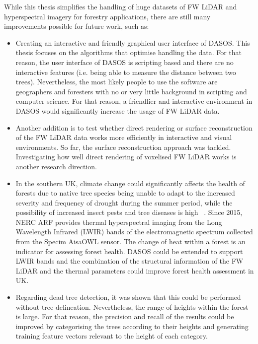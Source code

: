 \documentclass{subfiles}
\begin{document}
\par While this thesis simplifies the handling of huge datasets of FW LiDAR and hyperspectral imagery for forestry applications, there are still many improvements possible for future work, such as:
\begin{itemize}
	\item Creating an interactive and friendly graphical user interface of DASOS. This thesis focuses on the algorithms that optimise handling the data. For that reason, the user interface of DASOS is scripting based and there are no interactive features (i.e. being able to measure the distance between two trees). Nevertheless, the most likely people to use the software are geographers and foresters with no or very little background in scripting and computer science. For that reason, a friendlier and interactive environment in DASOS would significantly increase the usage of FW LiDAR data.  
	\item Another addition is to test whether direct rendering or surface reconstruction of the FW LiDAR data works more efficiently in interactive and visual environments. So far, the surface reconstruction approach was tackled. Investigating how well direct rendering of voxelised FW LiDAR works is another research direction. 
	\item In the southern UK, climate change could significantly affects the health of forests due to native tree species being unable to adapt to the increased severity and frequency of drought during the summer period, while the possibility of increased insect pests and tree diseases is high ~\cite{Read2009}.  Since 2015, NERC ARF provides thermal hyperspectral imaging from the Long Wavelength Infrared (LWIR) bands of the electromagnetic spectrum collected from the Specim AisaOWL sensor. The change of heat within a forest is an indicator for assessing forest health. DASOS could be extended to support LWIR bands and the combination of the structural information of the FW LiDAR and the thermal parameters could improve forest health assessment in UK.  	
	\item Regarding dead tree detection, it was shown that this could be performed without tree delineation. Nevertheless, the range of heights within the forest is large. For that reason, the precision and recall of the results could be improved by categorising the trees according to their heights and generating training feature vectors relevant to the height of each category. 
	
\end{itemize}
\end{document}
